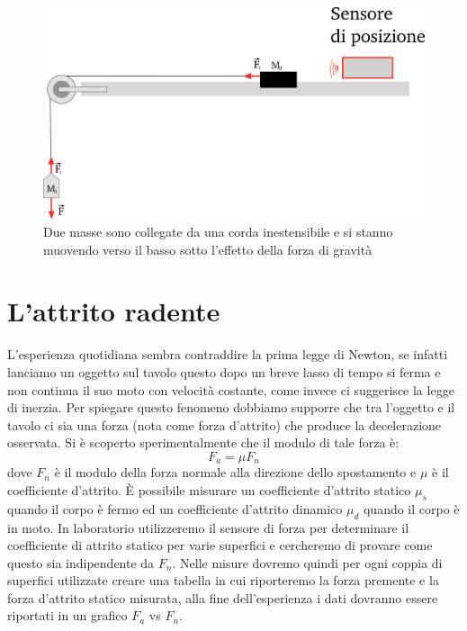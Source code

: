 \documentclass[a4paper,10pt,oneside]{article}
\begin{document}
\begin{figure}[H]
 \centering
 \includegraphics[width=\textwidth]{./Immagini/masse_filo_dinamico.png}
 \caption{Due masse sono collegate da una corda inestensibile e si stanno muovendo verso il basso sotto l'effetto della forza di gravità}
 \label{fig:filo_dinamico}
\end{figure}



\section*{L'attrito radente}

L'esperienza quotidiana sembra contraddire la prima legge di Newton, se infatti lanciamo un oggetto sul tavolo questo dopo un breve lasso di tempo si ferma e non continua il suo moto con velocità costante, come invece ci suggerisce la legge di inerzia.
Per spiegare questo fenomeno dobbiamo supporre che tra l'oggetto e il tavolo ci sia una forza (nota come forza d'attrito) che produce la decelerazione osservata. Si è scoperto sperimentalmente che il modulo di tale forza è:
\begin{equation}
 F_a=\mu F_n
\end{equation}
dove $F_n$ è il modulo della forza normale alla direzione dello spostamento e $\mu$ è il coefficiente d'attrito. È possibile misurare un coefficiente d'attrito statico $\mu_s$ quando il corpo è fermo ed un coefficiente d'attrito dinamico $\mu_d$ quando il corpo è in moto. 
In laboratorio utilizzeremo il sensore di forza per determinare il coefficiente di attrito statico per varie superfici e cercheremo di provare come questo sia indipendente da $F_n$. Nelle misure dovremo quindi per ogni coppia di superfici utilizzate creare una tabella in cui riporteremo la forza premente e la forza d'attrito statico misurata, alla fine dell'esperienza i dati dovranno essere riportati  in un grafico $F_a$ vs $F_n$.
\end{document}
